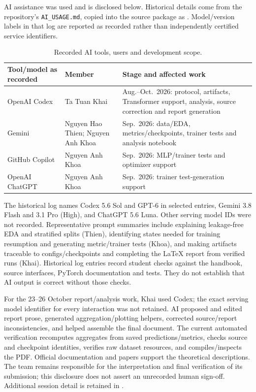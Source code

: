 AI assistance was used and is disclosed below. Historical details come from
the repository's \texttt{AI\_USAGE.md}, copied into the source package as
. Model/version labels in that log are
reported as recorded rather than independently certified service identifiers.
\begin{table}[H]\centering\small
\caption{Recorded AI tools, users and development scope.}
\label{tab:ai}
\begin{tabularx}{\linewidth}{>{\raggedright\arraybackslash}p{30mm}>{\raggedright\arraybackslash}p{29mm}>{\raggedright\arraybackslash}X}
\toprule Tool/model as recorded & Member & Stage and affected work\\\midrule
OpenAI Codex & Ta Tuan Khai & Aug.--Oct.\ 2026: protocol, artifacts, Transformer support,
analysis, source correction and report generation\\
Gemini & Nguyen Hao Thien; Nguyen Anh Khoa & Sep.\ 2026: data/EDA, metrics/checkpoints,
trainer tests and analysis notebook\\
GitHub Copilot & Nguyen Anh Khoa & Sep.\ 2026: MLP/trainer tests and optimizer support\\
OpenAI ChatGPT & Nguyen Anh Khoa & Sep.\ 2026: trainer test-generation support\\
\bottomrule
\end{tabularx}
\end{table}

The historical log names Codex 5.6 Sol and GPT-6 in selected entries, Gemini
3.8 Flash and 3.1 Pro (High), and ChatGPT 5.6 Luna. Other serving model IDs
were not recorded. Representative prompt summaries include explaining leakage-free EDA and stratified
splits (Thien), identifying states needed for training resumption and generating
metric/trainer tests (Khoa), and making artifacts traceable to configs/checkpoints
and completing the LaTeX report from verified runs (Khai).
Historical log entries record student checks against the handbook, source interfaces,
PyTorch documentation and tests. They do not establish that AI output is correct
without those checks.

For the 23--26 October report/analysis work, Khai used Codex; the exact serving
model identifier for every interaction was not retained. AI proposed and edited
report prose, generated aggregation/plotting helpers, corrected source/report
inconsistencies, and helped assemble the final document. The current automated
verification recomputes aggregates from saved predictions/metrics, checks source
and checkpoint identities, verifies raw dataset resources, and compiles/inspects
the PDF. Official documentation and papers support the theoretical descriptions.
The team remains responsible for the interpretation and final verification of
its submission; this disclosure does not assert an unrecorded human sign-off.
Additional session detail is retained in .
\FloatBarrier

